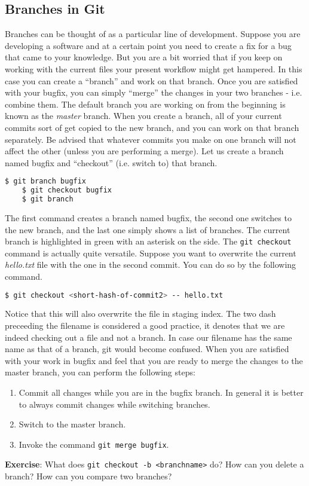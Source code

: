 \documentclass{article}
\begin{document}
\subsection{Branches in Git}
\label{subsec:branches}
Branches can be thought of as a particular line of development.
Suppose you are developing a software and at a certain point you need to create a fix for a bug that came to your knowledge.
But you are a bit worried that if you keep on working with the current files your present workflow might get hampered.
In this case you can create a ``branch'' and work on that branch.
Once you are satisfied with your bugfix, you can simply ``merge'' the changes in your two branches - i.e. combine them.
The default branch you are working on from the beginning is known as the \textit{master} branch.
When you create a branch, all of your current commits sort of get copied to the new branch, and you can work on that branch separately.
Be advised that whatever commits you make on one branch will not affect the other (unless you are performing a merge).
Let us create a branch named bugfix and ``checkout'' (i.e. switch to) that branch.
\begin{lstlisting}[language=bash]
	$ git branch bugfix
	$ git checkout bugfix
	$ git branch
\end{lstlisting}
The first command creates a branch named bugfix, the second one switches to the new branch,
and the last one simply shows a list of branches.
The current branch is highlighted in green with an asterisk on the side. The \verb|git checkout| command is actually quite versatile.
Suppose you want to overwrite the current \textit{hello.txt} file with the one in the second commit.
You can do so by the following command.
\begin{lstlisting}[language=bash]
	$ git checkout <short-hash-of-commit2> -- hello.txt
\end{lstlisting}
Notice that this will also overwrite the file in staging index.
The two dash preceeding the filename is considered a good practice, it denotes that we are indeed checking out a file and not a branch.
In case our filename has the same name as that of a branch, git would become confused.
When you are satisfied with your work in bugfix and feel that you are ready to merge the changes to the master branch,
you can perform the following steps:
\begin{enumerate}
	\item Commit all changes while you are in the bugfix branch. 
		In general it is better to always commit changes while switching branches.
	\item Switch to the master branch.
	\item Invoke the command \verb|git merge bugfix|.
\end{enumerate}
\textbf{Exercise}: What does \verb|git checkout -b <branchname>| do? How can you delete a branch?
How can you compare two branches?
\end{document}
